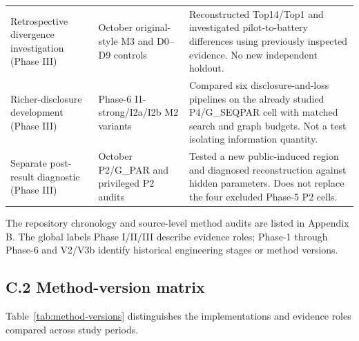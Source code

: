 \documentclass[10pt,a4paper]{article}
\begin{document}
\begin{longtable}{@{}L{0.21\textwidth}L{0.22\textwidth}p{0.52\textwidth}@{}}
Retrospective divergence investigation (Phase III) & October original-style M3 and D0--D9 controls & Reconstructed Top14/Top1 and investigated pilot-to-battery differences using previously inspected evidence. No new independent holdout. \\
Richer-disclosure development (Phase III) & Phase-6 I1-strong/I2a/I2b M2 variants & Compared six disclosure-and-loss pipelines on the already studied P4/G\_SEQPAR cell with matched search and graph budgets. Not a test isolating information quantity. \\
Separate post-result diagnostic (Phase III) & October P2/G\_PAR and privileged P2 audits & Tested a new public-induced region and diagnosed reconstruction against hidden parameters. Does not replace the four excluded Phase-5 P2 cells. \\
\bottomrule
\end{longtable}
\endgroup

The repository chronology and source-level method audits are listed in Appendix B. The global labels Phase I/II/III describe evidence roles; Phase-1 through Phase-6 and V2/V3b identify historical engineering stages or method versions.

\subsection*{C.2 Method-version matrix}

Table~\ref{tab:method-versions} distinguishes the implementations and evidence roles compared across study periods.
\end{document}
